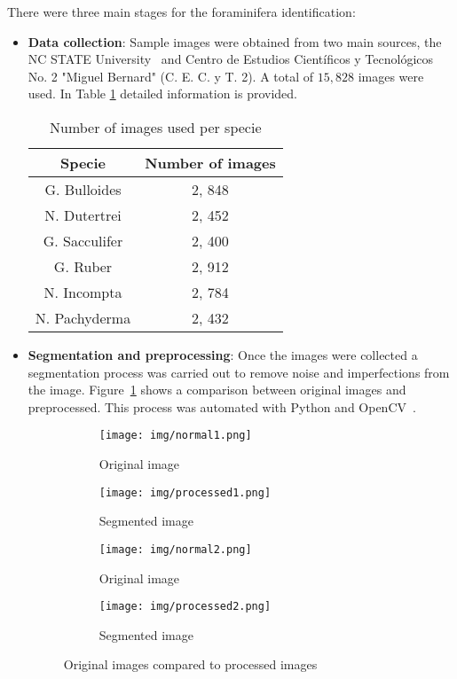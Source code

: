 \documentclass{article}
\begin{document}
	There were three main stages for the foraminifera identification:
	\begin{itemize}
		\item \textbf{Data collection}: Sample images were obtained from two main sources, the NC STATE University~\cite{ncstate2019} and Centro de Estudios Científicos y Tecnológicos No. 2 "Miguel Bernard" (C. E. C. y T. 2). A total of $15, 828$ images were used. In Table \ref{table:images} detailed information is provided.
		
		\begin{table}
			\centering
			\caption{Number of images used per specie}
			\label{table:images}
			\begin{tabular}{|c|c|}
				\toprule
				Specie	&	Number of images\\
				\midrule
				G. Bulloides	&	2, 848\\
				N. Dutertrei	&	2, 452\\
				G. Sacculifer	&	2, 400\\
				G. Ruber	&	2, 912\\
				N. Incompta	&	2, 784\\
				N. Pachyderma	&	2, 432\\
				\bottomrule
			\end{tabular}
		\end{table}
	
		\item \textbf{Segmentation and preprocessing}: Once the images were collected a segmentation process was carried out to remove noise and imperfections from the image. Figure~\ref{table:images} shows a comparison between original images and preprocessed. This process was automated with Python and OpenCV~\cite{opencvlibrary}.
		
		\begin{figure}
			\centering
			\begin{subfigure}[b]{0.4\textwidth}
				\centering
				\texttt{[image: img/normal1.png]}
				\caption{Original image}
			\end{subfigure}
			\begin{subfigure}[b]{0.4\textwidth}
				\centering
				\texttt{[image: img/processed1.png]}
				\caption{Segmented image}
			\end{subfigure}
			\hfill
			\centering
			\begin{subfigure}[b]{0.4\textwidth}
				\centering
				\texttt{[image: img/normal2.png]}
				\caption{Original image}
			\end{subfigure}
			\begin{subfigure}[b]{0.4\textwidth}
				\centering
				\texttt{[image: img/processed2.png]}
				\caption{Segmented image}
			\end{subfigure}
			\caption{Original images compared to processed images}
		\end{figure}
	

\end{itemize}
\end{document}
